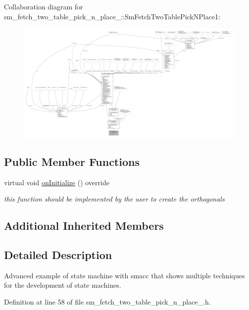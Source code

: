 Collaboration diagram for sm\+\_\+fetch\+\_\+two\+\_\+table\+\_\+pick\+\_\+n\+\_\+place\+\_\+:\+:Sm\+Fetch\+Two\+Table\+Pick\+N\+Place1\+:
\nopagebreak
\begin{figure}[H]
\begin{center}
\leavevmode
\includegraphics[width=350pt]{structsm__fetch__two__table__pick__n__place__1_1_1SmFetchTwoTablePickNPlace1__coll__graph}
\end{center}
\end{figure}
\subsection*{Public Member Functions}
\begin{DoxyCompactItemize}
\item 
virtual void \hyperlink{structsm__fetch__two__table__pick__n__place__1_1_1SmFetchTwoTablePickNPlace1_a30c707dad93553ebd88c0bb82a8586c5}{on\+Initialize} () override
\begin{DoxyCompactList}\small\item\em this function should be implemented by the user to create the orthogonals \end{DoxyCompactList}\end{DoxyCompactItemize}
\subsection*{Additional Inherited Members}


\subsection{Detailed Description}
Advanced example of state machine with smacc that shows multiple techniques for the development of state machines. 

Definition at line 58 of file sm\+\_\+fetch\+\_\+two\+\_\+table\+\_\+pick\+\_\+n\+\_\+place\+\_.\+h.



